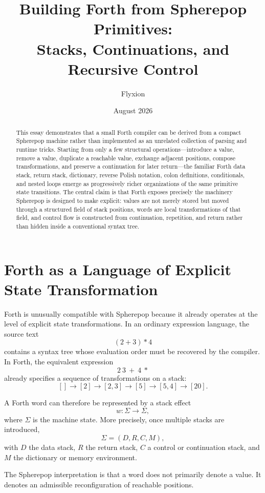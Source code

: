 \documentclass[12pt]{article}
\title{Building Forth from Spherepop Primitives:\\
Stacks, Continuations, and Recursive Control}
\author{Flyxion}
\date{August 2026}
\begin{document}
\maketitle

\begin{abstract}
This essay demonstrates that a small Forth compiler can be derived from a compact Spherepop machine rather than implemented as an unrelated collection of parsing and runtime tricks. Starting from only a few structural operations---introduce a value, remove a value, duplicate a reachable value, exchange adjacent positions, compose transformations, and preserve a continuation for later return---the familiar Forth data stack, return stack, dictionary, reverse Polish notation, colon definitions, conditionals, and nested loops emerge as progressively richer organizations of the same primitive state transitions. The central claim is that Forth exposes precisely the machinery Spherepop is designed to make explicit: values are not merely stored but moved through a structured field of stack positions, words are local transformations of that field, and control flow is constructed from continuation, repetition, and return rather than hidden inside a conventional syntax tree.
\end{abstract}

\section{Forth as a Language of Explicit State Transformation}

Forth is unusually compatible with Spherepop because it already operates at the level of explicit state transformations. In an ordinary expression language, the source text
\[
(2 + 3) * 4
\]
contains a syntax tree whose evaluation order must be recovered by the compiler. In Forth, the equivalent expression
\[
2\ 3\ +\ 4\ *
\]
already specifies a sequence of transformations on a stack:
\[
[] \longrightarrow [2] \longrightarrow [2,3] \longrightarrow [5] \longrightarrow [5,4] \longrightarrow [20].
\]

A Forth word can therefore be represented by a stack effect
\[
w : \Sigma \to \Sigma,
\]
where \(\Sigma\) is the machine state. More precisely, once multiple stacks are introduced,
\[
\Sigma = (D,R,C,M),
\]
with \(D\) the data stack, \(R\) the return stack, \(C\) a control or continuation stack, and \(M\) the dictionary or memory environment.

The Spherepop interpretation is that a word does not primarily denote a value. It denotes an admissible reconfiguration of reachable positions.
\end{document}
